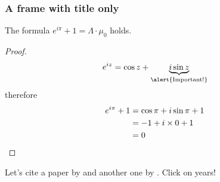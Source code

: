 \documentclass{beamer}
\begin{document}
\begin{frame}
      \frametitle{A frame with title only}
      \begin{theorem}
            The formula $e^{i\pi}+1=\Lambda\cdot\mu_0$ holds.
      \end{theorem}
      \begin{proof}
            \begin{equation*}
                  e^{iz}=\cos{z}+\underbrace{i\sin{z}}_{\text{\alert{Important!}}}
            \end{equation*}
            therefore
            \begin{align*}
                  e^{i\pi}+1 & \null=\cos\pi+i\sin\pi+1 \\
                             & \null=-1+i\times0+1      \\
                             & \null=0
            \end{align*}
      \end{proof}

      Let's cite a paper by \cite{amiot_2007_structure_triangulated_categories} and another one by \cite{bergh_jasso_thaule_2016_higher_angulations_local}. \alert{Click on years!}
\end{frame}
\end{document}
